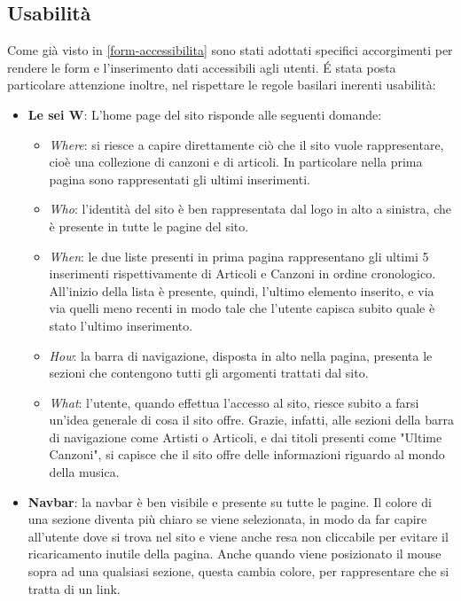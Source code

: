 \subsection{Usabilità}
\label{form-usabilita}
Come già visto in \ref{form-accessibilita} sono stati adottati specifici accorgimenti per rendere le form e l'inserimento dati accessibili agli utenti. \'E stata posta particolare attenzione inoltre, nel rispettare le regole basilari inerenti usabilit\`a: %

\begin{itemize}
    \item \textbf{Le sei W}: L'home page del sito risponde alle seguenti domande:
        \begin{itemize}
            \item \emph{Where}: si riesce a capire direttamente ci\`o che il sito vuole rappresentare, cio\`e una collezione di canzoni e di articoli. In particolare nella prima pagina sono rappresentati gli ultimi inserimenti.
            \item \emph{Who}: l'identit\`a del sito \`e ben rappresentata dal logo in alto a sinistra, che \`e presente in tutte le pagine del sito.
            \item \emph{When}: le due liste presenti in prima pagina rappresentano gli ultimi 5 inserimenti rispettivamente di Articoli e Canzoni in ordine cronologico. All'inizio della lista \`e presente, quindi, l'ultimo elemento inserito, e via via quelli meno recenti in modo tale che l'utente capisca subito quale \`e stato l'ultimo inserimento.
            \item \emph{How}: la barra di navigazione, disposta in alto nella pagina, presenta le sezioni che contengono tutti gli argomenti trattati dal sito.
            \item \emph{What}: l'utente, quando effettua l'accesso al sito, riesce subito a farsi un'idea generale di cosa il sito offre. Grazie, infatti, alle sezioni della barra di navigazione come Artisti o Articoli, e dai titoli presenti come "Ultime Canzoni", si capisce che il sito offre delle informazioni riguardo al mondo della musica.
        \end{itemize}

    \item \textbf{Navbar}: la navbar \`e ben visibile e presente su tutte le pagine. Il colore di una sezione diventa pi\`u chiaro se viene selezionata, in modo da far capire all'utente dove si trova nel sito e viene anche resa non cliccabile per evitare il ricaricamento inutile della pagina. Anche quando viene posizionato il mouse sopra ad una qualsiasi sezione, questa cambia colore, per rappresentare che si tratta di un link.


\end{itemize}
